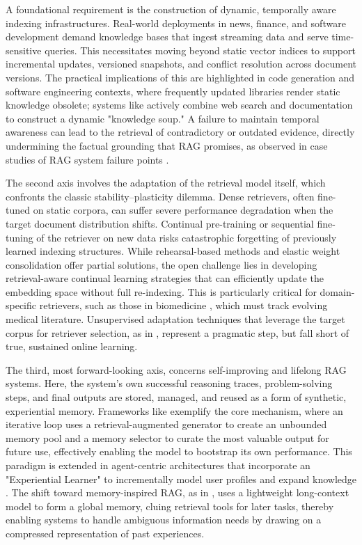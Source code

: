 \documentclass[11pt,a4paper]{article}
\begin{document}
A foundational requirement is the construction of dynamic, temporally aware indexing infrastructures. Real-world deployments in news, finance, and software development demand knowledge bases that ingest streaming data and serve time-sensitive queries. This necessitates moving beyond static vector indices to support incremental updates, versioned snapshots, and conflict resolution across document versions. The practical implications of this are highlighted in code generation and software engineering contexts, where frequently updated libraries render static knowledge obsolete; systems like \cite{arxiv:2402.12317v1} actively combine web search and documentation to construct a dynamic "knowledge soup." A failure to maintain temporal awareness can lead to the retrieval of contradictory or outdated evidence, directly undermining the factual grounding that RAG promises, as observed in case studies of RAG system failure points \cite{arxiv:2401.05856v1}.

The second axis involves the adaptation of the retrieval model itself, which confronts the classic stability--plasticity dilemma. Dense retrievers, often fine-tuned on static corpora, can suffer severe performance degradation when the target document distribution shifts. Continual pre-training or sequential fine-tuning of the retriever on new data risks catastrophic forgetting of previously learned indexing structures. While rehearsal-based methods and elastic weight consolidation offer partial solutions, the open challenge lies in developing retrieval-aware continual learning strategies that can efficiently update the embedding space without full re-indexing. This is particularly critical for domain-specific retrievers, such as those in biomedicine \cite{arxiv:2404.18443v1}, which must track evolving medical literature. Unsupervised adaptation techniques that leverage the target corpus for retriever selection, as in \cite{arxiv:2402.04853v1}, represent a pragmatic step, but fall short of true, sustained online learning.

The third, most forward-looking axis, concerns self-improving and lifelong RAG systems. Here, the system's own successful reasoning traces, problem-solving steps, and final outputs are stored, managed, and reused as a form of synthetic, experiential memory. Frameworks like \cite{arxiv:2305.02437v3} exemplify the core mechanism, where an iterative loop uses a retrieval-augmented generator to create an unbounded memory pool and a memory selector to curate the most valuable output for future use, effectively enabling the model to bootstrap its own performance. This paradigm is extended in agent-centric architectures that incorporate an "Experiential Learner" to incrementally model user profiles and expand knowledge \cite{arxiv:2405.06683v1}. The shift toward memory-inspired RAG, as in \cite{arxiv:2409.05591v2}, uses a lightweight long-context model to form a global memory, cluing retrieval tools for later tasks, thereby enabling systems to handle ambiguous information needs by drawing on a compressed representation of past experiences.
\end{document}
